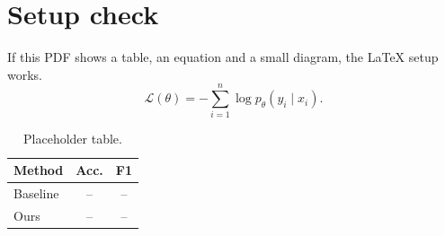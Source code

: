 \documentclass{article}
\begin{document}
\section{Setup check}
If this PDF shows a table, an equation and a small diagram, the LaTeX setup works.
\begin{equation}
  \mathcal{L}(\theta) = -\sum_{i=1}^{n} \log p_\theta(y_i \mid x_i).
\end{equation}
\begin{table}[h]\centering\small
\begin{tabular}{lcc}\toprule
Method & Acc. & F1 \\ \midrule
Baseline & -- & -- \\
Ours & -- & -- \\ \bottomrule
\end{tabular}
\caption{Placeholder table.}
\end{table}
\begin{center}
\end{center}
\end{document}
